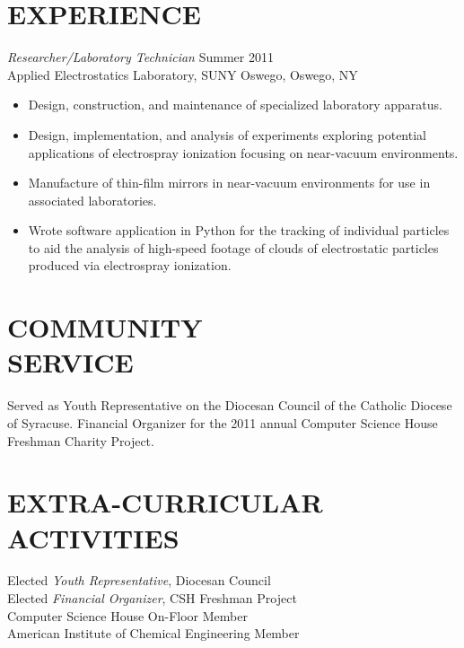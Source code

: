 \documentclass[line,margin]{res}
\begin{document}
\begin{resume}
\section{EXPERIENCE} {\sl Researcher/Laboratory Technician} \hfill Summer 2011 \\
                Applied Electrostatics Laboratory, 
                SUNY Oswego, Oswego, NY
                 \begin{itemize}  \itemsep -2pt %
                \item   Design, construction, and maintenance of 
				        specialized laboratory apparatus.
                \item   Design, implementation, and analysis of
				        experiments exploring potential applications
						of electrospray ionization focusing
						on near-vacuum environments.
				\item   Manufacture of thin-film mirrors in
				        near-vacuum environments for use in
						associated laboratories.
				\item   Wrote software application in Python
						for the tracking of individual particles
						to aid the analysis of high-speed footage
						of clouds of electrostatic particles
						produced via electrospray ionization.
                \end{itemize}
 
\section{COMMUNITY \\ SERVICE}  Served as Youth Representative on the 
                Diocesan Council of the Catholic Diocese of Syracuse. \newline 
                Financial Organizer for the 2011 annual Computer Science House
                Freshman Charity Project. 

\section{EXTRA-CURRICULAR \\ ACTIVITIES}             
            Elected {\it Youth Representative}, Diocesan Council \\
            Elected {\it Financial Organizer}, CSH Freshman Project \\
            	Computer Science House On-Floor Member \\
                American Institute of Chemical Engineering Member \\
\end{resume}
\end{document}
